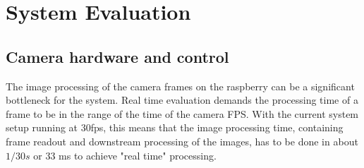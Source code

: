 \chapter{System Evaluation}
\section{Camera hardware and control}
The image  processing of the camera frames on the raspberry can be a significant bottleneck for the system. Real time evaluation demands the processing time of a frame to be in the range of the time of the camera FPS. With the current system setup running at 30fps, this means that the image processing time, containing frame readout and downstream processing of the images, has to be done in about $1/30s$ or 33 ms to achieve "real time" processing.
